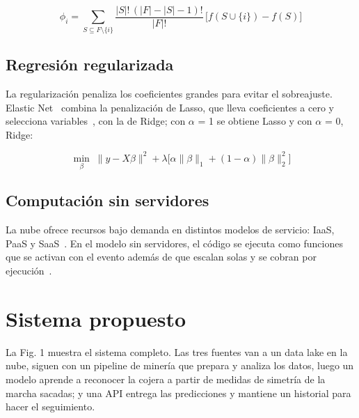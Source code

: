 \documentclass[conference,a4paper]{IEEEtran}
\begin{document}
\[
\phi_i = \sum_{S \subseteq F \setminus \{i\}} \frac{|S|!\,(|F|-|S|-1)!}{|F|!}\,\big[f(S \cup \{i\}) - f(S)\big]
\]

\subsection{Regresión regularizada}

La regularización penaliza los coeficientes grandes para evitar el sobreajuste. Elastic Net~\cite{zou2005} combina la penalización de Lasso, que lleva coeficientes a cero y selecciona variables~\cite{tibshirani1996}, con la de Ridge; con $\alpha$ = 1 se obtiene Lasso y con $\alpha$ = 0, Ridge:

\[
\min_{\beta}\; \lVert y - X\beta \rVert^2 + \lambda \big[ \alpha \lVert\beta\rVert_1 + (1-\alpha) \lVert\beta\rVert_2^2 \big]
\]

\subsection{Computación sin servidores}

La nube ofrece recursos bajo demanda en distintos modelos de servicio: IaaS, PaaS y SaaS~\cite{mell2011}. En el modelo sin servidores, el código se ejecuta como funciones que se activan con el evento además de que escalan solas y se cobran por ejecución~\cite{terraform}.

\section{Sistema propuesto}

La Fig. 1 muestra el sistema completo. Las tres fuentes van a un data lake en la nube, siguen con un pipeline de minería que prepara y analiza los datos, luego un modelo aprende a reconocer la cojera a partir de medidas de simetría de la marcha sacadas; y una API entrega las predicciones y mantiene un historial para hacer el seguimiento.
\end{document}
